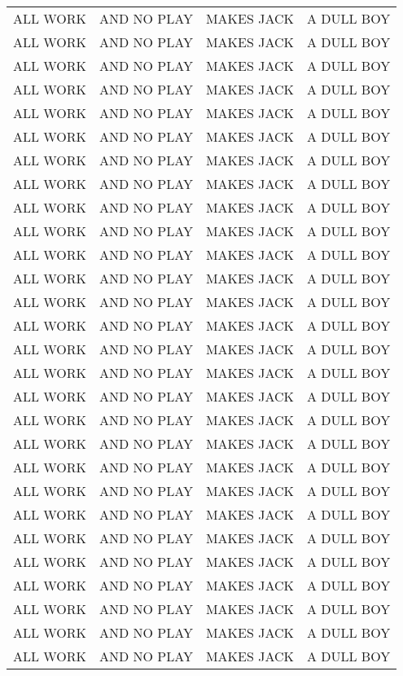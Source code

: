 \documentclass{article}
\begin{document}
\begin{longtable}[c]{cccc}
		ALL WORK & AND NO PLAY & MAKES JACK & A DULL BOY \\
		ALL WORK & AND NO PLAY & MAKES JACK & A DULL BOY \\
		ALL WORK & AND NO PLAY & MAKES JACK & A DULL BOY \\
		ALL WORK & AND NO PLAY & MAKES JACK & A DULL BOY \\
		ALL WORK & AND NO PLAY & MAKES JACK & A DULL BOY \\
		ALL WORK & AND NO PLAY & MAKES JACK & A DULL BOY \\
		ALL WORK & AND NO PLAY & MAKES JACK & A DULL BOY \\
		ALL WORK & AND NO PLAY & MAKES JACK & A DULL BOY \\
		ALL WORK & AND NO PLAY & MAKES JACK & A DULL BOY \\
		ALL WORK & AND NO PLAY & MAKES JACK & A DULL BOY \\
		ALL WORK & AND NO PLAY & MAKES JACK & A DULL BOY \\
		ALL WORK & AND NO PLAY & MAKES JACK & A DULL BOY \\
		ALL WORK & AND NO PLAY & MAKES JACK & A DULL BOY \\
		ALL WORK & AND NO PLAY & MAKES JACK & A DULL BOY \\
		ALL WORK & AND NO PLAY & MAKES JACK & A DULL BOY \\
		ALL WORK & AND NO PLAY & MAKES JACK & A DULL BOY \\
		ALL WORK & AND NO PLAY & MAKES JACK & A DULL BOY \\
		ALL WORK & AND NO PLAY & MAKES JACK & A DULL BOY \\
		ALL WORK & AND NO PLAY & MAKES JACK & A DULL BOY \\
		ALL WORK & AND NO PLAY & MAKES JACK & A DULL BOY \\
		ALL WORK & AND NO PLAY & MAKES JACK & A DULL BOY \\
		ALL WORK & AND NO PLAY & MAKES JACK & A DULL BOY \\
		ALL WORK & AND NO PLAY & MAKES JACK & A DULL BOY \\
		ALL WORK & AND NO PLAY & MAKES JACK & A DULL BOY \\
		ALL WORK & AND NO PLAY & MAKES JACK & A DULL BOY \\
		ALL WORK & AND NO PLAY & MAKES JACK & A DULL BOY \\
		ALL WORK & AND NO PLAY & MAKES JACK & A DULL BOY \\
		ALL WORK & AND NO PLAY & MAKES JACK & A DULL BOY \\

\end{longtable}
\end{document}
